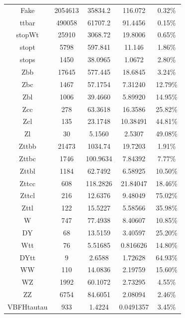 \begin{table}
\begin{tabular}{|c|c|c|c|c|}
	Fake     	  &	2054613  & 35834.2   & 116.072    &	0.32\% \\
	ttbar     	  &	490058    & 61707.2   & 91.4456    & 0.15\% \\
	stopWt 	   &	25910      & 3068.72   & 19.8006    & 0.65\% \\
	stopt   	   &	5798        & 597.841   & 11.146      &	1.86\% \\
	stops 	   &	1450        & 38.0965   & 1.0672      &	 2.80\% \\
	Zbb 		   &	17645      & 577.445   & 18.6845    &	 3.24\% \\
	Zbc 		   &	1467        & 57.1754   & 7.31240    &	 12.79\% \\
	Zbl 	            &	1006        & 39.4660   & 5.89920    &	 14.95\% \\
	Zcc 	            &	278 	        & 63.3618   & 16.3586    &	 25.82\% \\
	Zcl	            &	135          & 23.1748   & 10.38491   & 44.81\% \\
	Zl	            &	30            & 5.1560     & 2.5307       & 49.08\% \\
	Zttbb 	    &	21473      & 1034.74   & 19.7203     & 1.91\% \\
	Zttbc 	    &	1746        & 100.9634 & 7.84392     & 7.77\% \\
	Zttbl 		    &	1184        & 62.7492   & 6.58925     & 10.50\% \\
	Zttcc 	    &	608          & 118.2826 & 21.84047   & 18.46\% \\
	Zttcl		    &	216          & 12.6376   & 9.48049     & 75.02\% \\
	Zttl 		    &	122          & 15.5227   & 5.58566     & 35.98\% \\
	W 		    &	747          & 77.4938   & 8.40607     & 10.85\% \\
	DY                &	68            & 13.5159   & 3.40597     & 25.20\% \\
	Wtt               &	76            & 5.51685   & 0.816626   & 14.80\% \\
	DYtt              &	9              & 2.6588     & 1.72628     & 64.93\% \\
	WW              &	110          & 14.0836   & 2.19759     & 15.60\% \\
	WZ               &	1992        & 60.1072   & 2.73295     & 4.55\% \\
	ZZ 		    &	6754        & 84.6051   & 2.08094     & 2.46\% \\
	VBFHtautau &	933          & 1.4224     & 0.0491357 & 3.45\% \\

\end{tabular}
\end{table}

